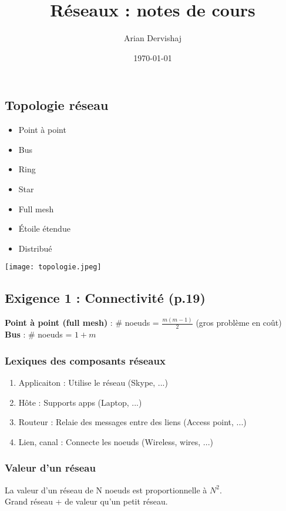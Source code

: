 \documentclass[12pt]{article}
\title{Réseaux : notes de cours}
\author{Arian Dervishaj}
\date{\today}
\begin{document}
\maketitle
\pagebreak

\subsection*{Topologie réseau}
\begin{minipage}{0.3\textwidth}
    \begin{itemize}
        \item Point à point
        \item Bus
        \item Ring
        \item Star
        \item Full mesh
        \item Étoile étendue
        \item Distribué
    \end{itemize}
\end{minipage}
\begin{minipage}{0.6\textwidth}
    \texttt{[image: topologie.jpeg]}
\end{minipage}

\subsection*{Exigence 1 : Connectivité (p.19)}


\textbf{Point à point (full mesh) }: \# noeuds = $\frac{m(m-1)}{2}$ (gros problème en coût)\\
\textbf{Bus} : \# noeuds = $1+m$

\subsubsection*{Lexiques des composants réseaux}
\begin{enumerate}
    \item Applicaiton : Utilise le réseau (Skype, ...)
    \item Hôte : Supports apps (Laptop, ...)
    \item Routeur : Relaie des messages entre des liens (Access point, ...)
    \item Lien, canal : Connecte les noeuds (Wireless, wires, ...)
\end{enumerate}

\subsubsection*{Valeur d'un réseau}
La valeur d'un réseau de N noeuds est proportionnelle à $N^{2}$. \\
Grand réseau + de valeur qu'un petit réseau.
\end{document}
